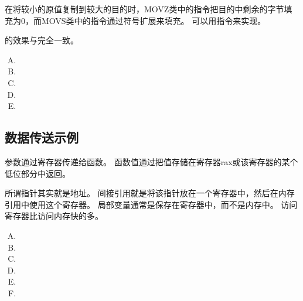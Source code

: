 {{        在将较小的原值复制到较大的目的时，MOVZ类中的指令把目的中剩余的字节填充为0，而MOVS类中的指令通过符号扩展来填充。
        可以用指令来实现。

        的效果与完全一致。

        \begin{practicec}
            \begin{enumerate}[A.]
                \item {}
                \item {}
                \item {}
                \item {}
                \item {}
            \end{enumerate}
        \end{practicec}

        \begin{practicec}

        \end{practicec}
    }

    \subsection{数据传送示例}
    {
        参数通过寄存器传递给函数。
        函数值通过把值存储在寄存器rax或该寄存器的某个低位部分中返回。

        所谓指针其实就是地址。
        间接引用就是将该指针放在一个寄存器中，然后在内存引用中使用这个寄存器。
        局部变量通常是保存在寄存器中，而不是内存中。
        访问寄存器比访问内存快的多。

        \begin{practicec}
            \begin{enumerate}[A.]
                \item {}
                \item {}
                \item {}
                \item {}
                \item {}
                \item {}
            \end{enumerate}
        \end{practicec}

}}
